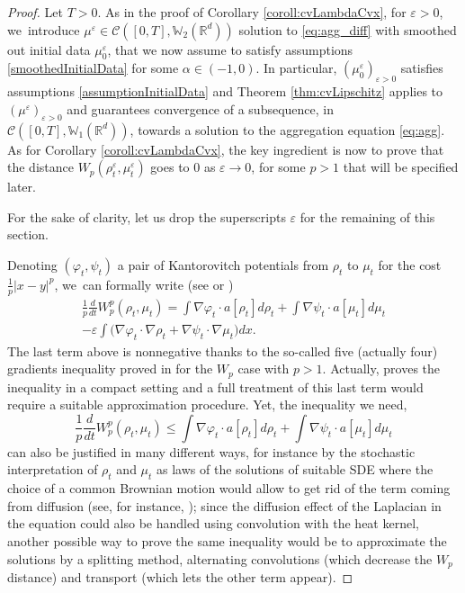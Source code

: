 \documentclass[JEP,XML,SOM,Unicode, NoFloatCountersInSection,published]{cedram}
\def\RR{\mathbb{R}}
\def\WW{\mathbb{W}}
\def\eps{\varepsilon}
\def\calC{{\mathcal C}}
\theoremstyle{plain}
\theoremstyle{definition}
\begin{document}
\begin{proof}
Let $T>0$. As in the proof of Corollary \ref{coroll:cvLambdaCvx}, for $\eps > 0$, we~introduce $\mu^\eps \in \calC([0,T], \WW_2(\RR^d))$ solution to \eqref{eq:agg_diff} with smoothed out initial data $\mu_0^\eps$, that we now assume to satisfy assumptions \eqref{smoothedInitialData} for some $\alpha \in (-1,0)$. In particular, $(\mu_0^\eps)_{\eps > 0}$ satisfies assumptions \eqref{assumptionInitialData} and Theorem \ref{thm:cvLipschitz} applies to $(\mu^\eps)_{\eps>0}$ and guarantees convergence of a subsequence, in $\calC([0,T], \WW_1(\RR^d))$, towards a solution to the aggregation equation \eqref{eq:agg}. As for Corollary \ref{coroll:cvLambdaCvx}, the key ingredient is now to prove that the distance $W_p(\rho_t^\eps, \mu_t^\eps)$ goes to 0 as $\eps \to 0$, for some $p > 1$ that will be specified later.

For the sake of clarity, let us drop the superscripts $\eps$ for the remaining of this section.

Denoting $(\varphi_t, \psi_t)$ a pair of Kantorovitch potentials from $\rho_t$ to $\mu_t$ for the cost $\frac{1}{p}|x-y|^p$, we~can formally write (see \cite[Th.\,5.24]{otam15} or \cite[Th.\,8.4.7]{ambrosio08})
\begin{multline*}
\frac 1p \frac{d}{dt} W_p^p(\rho_t, \mu_t) = \int \nabla \varphi_t \cdot a[\rho_t] d\rho_t
+ \int \nabla \psi_t \cdot a[\mu_t] d\mu_t \\
- \eps \int \Big(\nabla \varphi_t \cdot \nabla \rho_t + \nabla \psi_t \cdot \nabla \mu_t \Big) dx.
\end{multline*}
The last term above is nonnegative thanks to the so-called five (actually four) gradients inequality proved in \cite{caillet21} for the $W_p$ case with $p>1$. Actually, \cite{caillet21} proves the inequality in a compact setting and a full treatment of this last term would require a suitable approximation procedure. Yet, the inequality we need, \ie
\[
\frac 1p \frac{d}{dt} W_p^p(\rho_t, \mu_t) \leq \int \nabla \varphi_t \cdot a[\rho_t] d\rho_t + \int \nabla \psi_t \cdot a[\mu_t] d\mu_t
\]
can also be justified in many different ways, for instance by the stochastic interpretation of $\rho_t$ and $\mu_t$ as laws of the solutions of suitable SDE where the choice of a common Brownian motion would allow to get rid of the term coming from diffusion (see, for instance, \cite{BolGenGui}); since the diffusion effect of the Laplacian in the equation could also be handled using convolution with the heat kernel, another possible way to prove the same inequality would be to approximate the solutions by a splitting method, alternating convolutions (which decrease the $W_p$ distance) and transport (which lets the other term appear).


\end{proof}
\end{document}
